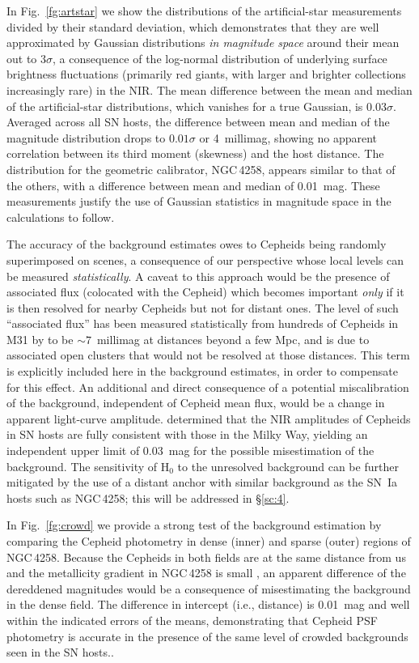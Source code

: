 \documentclass[12pt]{aastex631}
\begin{document}
In Fig.~\ref{fg:artstar} we show the distributions of the artificial-star measurements divided by their standard deviation, which demonstrates that they are well approximated by Gaussian distributions {\it in magnitude space} around their mean out to $3\sigma$, a consequence of the log-normal distribution of underlying surface brightness fluctuations (primarily red giants, with larger and brighter collections increasingly rare) in the NIR.  The mean difference between the mean and median of the artificial-star distributions, which vanishes for a true Gaussian, is $0.03\sigma$.  Averaged across all SN hosts, the difference between mean and median of the magnitude distribution drops to $0.01\sigma$ or 4~millimag, showing no apparent correlation between its third moment (skewness) and the host distance.  The distribution for the geometric calibrator, NGC$\,$4258, appears similar to that of the others, with a difference between mean and median of 0.01~mag.  These measurements justify the use of Gaussian statistics in magnitude space in the calculations to follow.

The accuracy of the background estimates owes to Cepheids being randomly superimposed on scenes, a consequence of our perspective whose local levels can be measured {\it statistically}.  A caveat to this approach would be the presence of associated flux (colocated with the Cepheid) which becomes important {\it only} if it is then resolved for nearby Cepheids but not for distant ones.  The level of such ``associated flux'' has been measured statistically from hundreds of Cepheids in M31 by \citet{Anderson:2018} to be $\sim 7$~millimag at distances beyond a few Mpc, and is due to associated open clusters that would not be resolved at those distances.  This term is explicitly included here in the background estimates, in order to compensate for this effect.  An additional and direct consequence of a potential miscalibration of the background, independent of Cepheid mean flux, would be a change in apparent light-curve amplitude.  \citet{Riess:2020} determined that the NIR amplitudes of Cepheids in SN hosts are fully consistent with those in the Milky Way, yielding an independent upper limit of 0.03~mag for the possible misestimation of the background.  The sensitivity of H$_0$ to the unresolved background can be further mitigated by the use of a distant anchor with similar background as the SN~Ia hosts such as NGC$\,$4258; this will be addressed in \S\ref{sc:4}.  

In Fig.~\ref{fg:crowd} we provide a strong test of the background estimation by comparing the Cepheid photometry in dense (inner) and sparse (outer) regions of NGC$\,$4258.  Because the Cepheids in both fields are at the same distance from us and the metallicity gradient in NGC$\,$4258 is small \citep{Bresolin:2016}, an apparent difference of the dereddened magnitudes would be a consequence of misestimating the background in the dense field. The difference in intercept (i.e., distance) is 0.01~mag and well within the indicated errors of the means, demonstrating that Cepheid PSF photometry is accurate in the presence of the same level of crowded backgrounds seen in the SN hosts..
\end{document}
